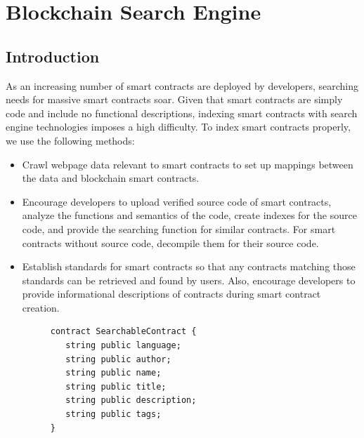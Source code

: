 \section{Blockchain Search Engine}
\label{sec:search}

\subsection{Introduction}

As an increasing number of smart contracts are deployed by developers, searching needs for massive smart contracts soar. Given that smart contracts are simply code and include no functional descriptions, indexing smart contracts with search engine technologies imposes a high difficulty. To index smart contracts properly, we use the following methods:


\begin{itemize}
	\item Crawl webpage data relevant to smart contracts to set up mappings between the data and blockchain smart contracts.
	\item Encourage developers to upload verified source code of smart contracts, analyze the functions and semantics of the code, create indexes for the source code, and provide the searching function for similar contracts. For smart contracts without source code, decompile them for their source code.
	\item Establish standards for smart contracts so that any contracts matching those standards can be retrieved and found by users. Also, encourage developers to provide informational descriptions of contracts during smart contract creation.

	\begin{figure}[ht]
  	\centering
  	\begin{minipage}{.4\linewidth}
	\begin{lstlisting}[frame=single]
contract SearchableContract {
   string public language;
   string public author;
   string public name;
   string public title;
   string public description;
   string public tags;
}
	\end{lstlisting}
  	\end{minipage}
	\end{figure}

\end{itemize}

